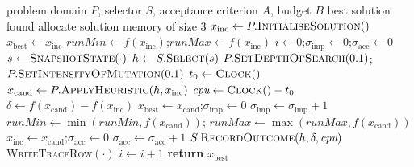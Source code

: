 %
%

\begin{algorithm}[htbp]
\caption{Single-point selection hyper-heuristic. Techniques \texttt{SP-SR-LA},
\texttt{SP-CF-LA} and \texttt{SP-CF-AILTA} instantiate this loop with different
selection and acceptance objects.}
\label{alg:sphh}
\begin{algorithmic}[1]
\Require problem domain $P$, selector $S$, acceptance criterion $A$, budget $B$
\Ensure best solution found
\State allocate solution memory of size 3 
\State $x_{\text{inc}} \gets P.\textsc{InitialiseSolution}()$
\State $x_{\text{best}} \gets x_{\text{inc}}$
\State $\textit{runMin} \gets f(x_{\text{inc}})$;\quad $\textit{runMax} \gets f(x_{\text{inc}})$
\State $i \gets 0$;\quad $\sigma_{\text{imp}} \gets 0$;\quad $\sigma_{\text{acc}} \gets 0$
  \State $s \gets \textsc{SnapshotState}(\cdot)$
  \State $h \gets S.\textsc{Select}(s)$ 
  \State $P.\textsc{SetDepthOfSearch}(0.1)$;\quad $P.\textsc{SetIntensityOfMutation}(0.1)$
  \State $t_0 \gets \textsc{Clock}()$
  \State $x_{\text{cand}} \gets P.\textsc{ApplyHeuristic}(h, x_{\text{inc}})$
  \State $\textit{cpu} \gets \textsc{Clock}() - t_0$
  \State $\delta \gets f(x_{\text{cand}}) - f(x_{\text{inc}})$
    \State $x_{\text{best}} \gets x_{\text{cand}}$;\quad $\sigma_{\text{imp}} \gets 0$
  \Else
    \State $\sigma_{\text{imp}} \gets \sigma_{\text{imp}} + 1$
  \EndIf
  \State $\textit{runMin} \gets \min(\textit{runMin}, f(x_{\text{cand}}))$;\quad
         $\textit{runMax} \gets \max(\textit{runMax}, f(x_{\text{cand}}))$
    \State $x_{\text{inc}} \gets x_{\text{cand}}$;\quad $\sigma_{\text{acc}} \gets 0$
  \Else
    \State $\sigma_{\text{acc}} \gets \sigma_{\text{acc}} + 1$
  \EndIf
  \State $S.\textsc{RecordOutcome}(h, \delta, \textit{cpu})$
  \State \textsc{WriteTraceRow}$(\cdot)$
  \State $i \gets i + 1$
\EndWhile
\State \textbf{return} $x_{\text{best}}$
\end{algorithmic}
\end{algorithm}

